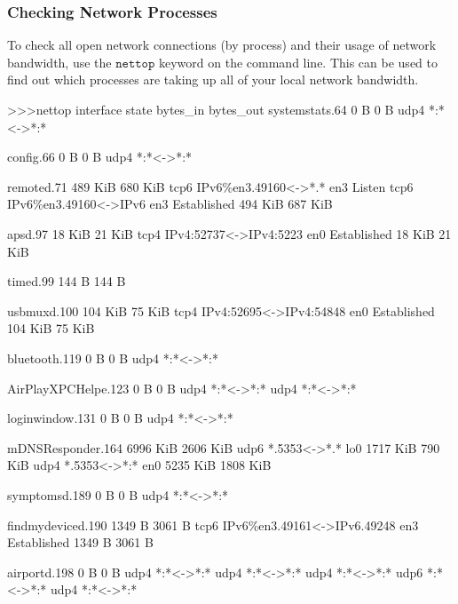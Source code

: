 \documentclass[a4paper, 12pt]{report}
\theoremstyle{remark}
\theoremstyle{definition}
\begin{document}
\subsubsection{Checking Network Processes}
To check all open network connections (by process) and their usage of network bandwidth, use the $\texttt{nettop}$ keyword on the command line. This can be used to find out which processes are taking up all of your local network bandwidth. 
\begin{python}
>>>nettop 
                            interface       state    bytes_in  bytes_out
systemstats.64                                            0 B        0 B
udp4 *:*<->*:*

config.66                                                 0 B        0 B
udp4 *:*<->*:*

remoted.71                                            489 KiB    680 KiB 
tcp6 IPv6\%en3.49160<->*.*        en3      Listen      
tcp6 IPv6\%en3.49160<->IPv6       en3 Established     494 KiB    687 KiB

apsd.97                                                18 KiB     21 KiB
tcp4 IPv4:52737<->IPv4:5223       en0 Established      18 KiB     21 KiB

timed.99                                                144 B      144 B

usbmuxd.100                                           104 KiB     75 KiB
tcp4 IPv4:52695<->IPv4:54848      en0 Established     104 KiB     75 KiB
 
bluetooth.119                                             0 B        0 B
udp4 *:*<->*:*

AirPlayXPCHelpe.123                                       0 B        0 B
udp4 *:*<->*:*
udp4 *:*<->*:*

loginwindow.131                                           0 B        0 B
udp4 *:*<->*:*

mDNSResponder.164                                    6996 KiB   2606 KiB
udp6 *.5353<->*.*                 lo0                1717 KiB    790 KiB
udp4 *.5353<->*:*                 en0                5235 KiB   1808 KiB

symptomsd.189                                             0 B        0 B
udp4 *:*<->*:*

findmydeviced.190                                      1349 B     3061 B
tcp6 IPv6\%en3.49161<->IPv6.49248 en3 Established      1349 B     3061 B

airportd.198                                              0 B        0 B
udp4 *:*<->*:*
udp4 *:*<->*:*
udp4 *:*<->*:*
udp6 *:*<->*:*
udp4 *:*<->*:*


\end{python}
\end{document}
